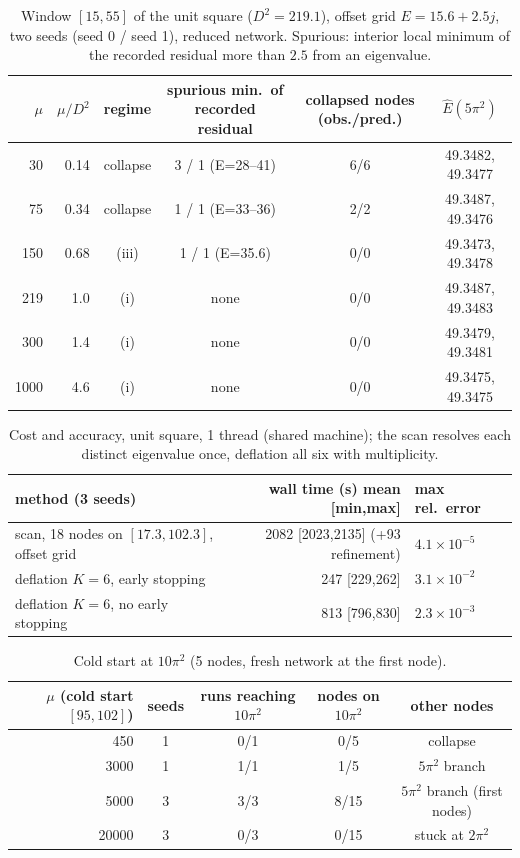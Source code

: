 \begin{table}[H]\centering\small
\begin{tabular}{rrcccc}
\toprule
$\mu$ & $\mu/D^2$ & regime & spurious min.\ of recorded residual & collapsed nodes (obs./pred.) & $\hat E(5\pi^2)$\\
\midrule
30 & 0.14 & collapse & 3 / 1 (E=28--41) & 6/6 & 49.3482, 49.3477\\
75 & 0.34 & collapse & 1 / 1 (E=33--36) & 2/2 & 49.3487, 49.3476\\
150 & 0.68 & (iii) & 1 / 1 (E=35.6) & 0/0 & 49.3473, 49.3478\\
219 & 1.0 & (i) & none & 0/0 & 49.3487, 49.3483\\
300 & 1.4 & (i) & none & 0/0 & 49.3479, 49.3481\\
1000 & 4.6 & (i) & none & 0/0 & 49.3475, 49.3475\\
\bottomrule
\end{tabular}
\caption{Window $[15,55]$ of the unit square ($D^2=219.1$), offset grid $E=15.6+2.5j$, two seeds (seed 0 / seed 1), reduced network. Spurious: interior local minimum of the recorded residual more than $2.5$ from an eigenvalue.}
\end{table}

\begin{table}[H]\centering\small
\begin{tabular}{lrl}
\toprule
method (3 seeds) & wall time (s) mean [min,max] & max rel.\ error\\
\midrule
scan, 18 nodes on $[17.3,102.3]$, offset grid & 2082 [2023,2135] (+93 refinement) & $4.1\times10^{-5}$\\
deflation $K=6$, early stopping & 247 [229,262] & $3.1\times10^{-2}$\\
deflation $K=6$, no early stopping & 813 [796,830] & $2.3\times10^{-3}$\\
\bottomrule
\end{tabular}
\caption{Cost and accuracy, unit square, 1 thread (shared machine); the scan resolves each distinct eigenvalue once, deflation all six with multiplicity.}
\end{table}

\begin{table}[H]\centering\small
\begin{tabular}{rcccc}
\toprule
$\mu$ (cold start $[95,102]$) & seeds & runs reaching $10\pi^2$ & nodes on $10\pi^2$ & other nodes\\
\midrule
450 & 1 & 0/1 & 0/5 & collapse\\
3000 & 1 & 1/1 & 1/5 & $5\pi^2$ branch\\
5000 & 3 & 3/3 & 8/15 & $5\pi^2$ branch (first nodes)\\
20000 & 3 & 0/3 & 0/15 & stuck at $2\pi^2$\\
\bottomrule
\end{tabular}
\caption{Cold start at $10\pi^2$ (5 nodes, fresh network at the first node).}
\end{table}

